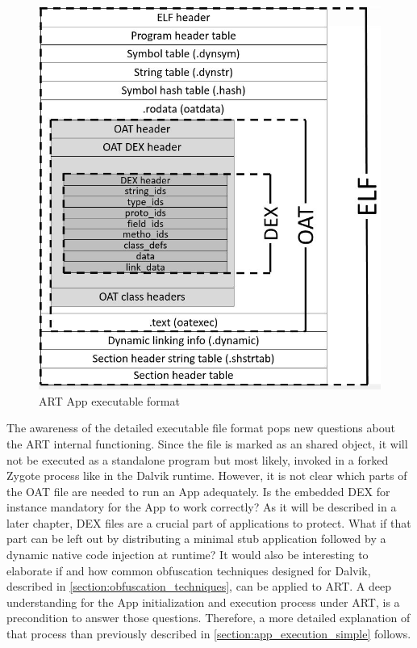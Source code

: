 \begin{figure}[htb]
  \centering
  \includegraphics[scale=0.6]{figures/andelf_format}
  \caption[ART App executable format]{ART App executable format}
  \label{fig:andelf_format}
\end{figure}

The awareness of the detailed executable file format pops
new questions about the ART internal functioning.
Since the file is marked as an shared object, it will not be
executed as a standalone program but most likely,
invoked in a forked Zygote process like in the Dalvik runtime.
However, it is not clear which parts of the OAT file are
needed to run an App adequately. Is the embedded DEX for instance
mandatory for the App to work correctly? As it will be described
in a later chapter, DEX files are
a crucial part of applications to protect. What if that part
can be left out by distributing a minimal stub application
followed by a dynamic native code injection at runtime?
It would also be interesting to elaborate if and how common obfuscation
techniques designed for Dalvik, described in \autoref{section:obfuscation_techniques}, can be applied to ART.
A deep understanding for the App initialization and execution
process under ART, is a precondition to answer those
questions. Therefore, a more detailed explanation of that process
than previously described in
\autoref{section:app_execution_simple} follows.

